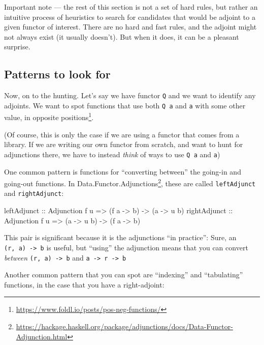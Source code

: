 \documentclass[]{article}
\newenvironment{Shaded}{}{}
\newcommand{\DataTypeTok}[1]{\textcolor[rgb]{0.56,0.13,0.00}{#1}}
\newcommand{\NormalTok}[1]{#1}
\newcommand{\OtherTok}[1]{\textcolor[rgb]{0.00,0.44,0.13}{#1}}
\renewcommand{\href}[2]{#2\footnote{\url{#1}}}
\begin{document}
Important note --- the rest of this section is not a set of hard rules, but
rather an intuitive process of heuristics to search for candidates that would be
adjoint to a given functor of interest. There are no hard and fast rules, and
the adjoint might not always exist (it usually doesn't). But when it does, it
can be a pleasant surprise.

\hypertarget{patterns-to-look-for}{%
\subsection{Patterns to look for}\label{patterns-to-look-for}}

Now, on to the hunting. Let's say we have functor \texttt{Q} and we want to
identify any adjoints. We want to spot functions that use both \texttt{Q\ a} and
\texttt{a} with some other value, in
\href{https://www.foldl.io/posts/pos-neg-functions/}{opposite positions}.

(Of course, this is only the case if we are using a functor that comes from a
library. If we are writing our own functor from scratch, and want to hunt for
adjunctions there, we have to instead \emph{think} of ways to use \texttt{Q\ a}
and \texttt{a})

One common pattern is functions for ``converting between'' the going-in and
going-out functions. In
\href{https://hackage.haskell.org/package/adjunctions/docs/Data-Functor-Adjunction.html}{Data.Functor.Adjunctions},
these are called \texttt{leftAdjunct} and \texttt{rightAdjunct}:

\begin{Shaded}
\begin{Highlighting}[]
\OtherTok{leftAdjunct  ::} \DataTypeTok{Adjunction}\NormalTok{ f u }\OtherTok{=>}\NormalTok{ (f a }\OtherTok{{-}>}\NormalTok{ b) }\OtherTok{{-}>}\NormalTok{ (a }\OtherTok{{-}>}\NormalTok{ u b)}
\OtherTok{rightAdjunct ::} \DataTypeTok{Adjunction}\NormalTok{ f u }\OtherTok{=>}\NormalTok{ (a }\OtherTok{{-}>}\NormalTok{ u b) }\OtherTok{{-}>}\NormalTok{ (f a }\OtherTok{{-}>}\NormalTok{ b)}
\end{Highlighting}
\end{Shaded}

This pair is significant because it is the adjunctions ``in practice'': Sure, an
\texttt{(r,\ a)\ -\textgreater{}\ b} is useful, but ``using'' the adjunction
means that you can convert \emph{between} \texttt{(r,\ a)\ -\textgreater{}\ b}
and \texttt{a\ -\textgreater{}\ r\ -\textgreater{}\ b}

Another common pattern that you can spot are ``indexing'' and ``tabulating''
functions, in the case that you have a right-adjoint:
\end{document}
